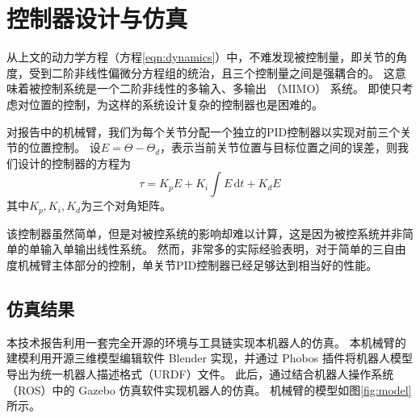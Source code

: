 \documentclass{ctexart}
\begin{document}
\section{控制器设计与仿真}

从上文的动力学方程（方程\ref{eqn:dynamics}）中，不难发现被控制量，即关节的角度，受到二阶非线性偏微分方程组的统治，且三个控制量之间是强耦合的。
这意味着被控制系统是一个二阶非线性的多输入、多输出 （MIMO） 系统。
即使只考虑对位置的控制，为这样的系统设计复杂的控制器也是困难的。

对报告中的机械臂，我们为每个关节分配一个独立的PID控制器以实现对前三个关节的位置控制。
设$E = \Theta - \Theta_d$，表示当前关节位置与目标位置之间的误差，则我们设计的控制器的方程为
\[
    \tau = K_p E + K_i \int E \, \mathrm d t + K_d \dot E
\]
其中$K_p, K_i, K_d$为三个对角矩阵。

该控制器虽然简单，但是对被控系统的影响却难以计算，这是因为被控系统并非简单的单输入单输出线性系统。
然而，非常多的实际经验表明，对于简单的三自由度机械臂主体部分的控制，单关节PID控制器已经足够达到相当好的性能。

\subsection{仿真结果}

本技术报告利用一套完全开源的环境与工具链实现本机器人的仿真。
本机械臂的建模利用开源三维模型编辑软件 Blender 实现，并通过 Phobos 插件将机器人模型导出为统一机器人描述格式（URDF）文件。
此后，通过结合机器人操作系统（ROS）中的 Gazebo 仿真软件实现机器人的仿真。
机械臂的模型如图\ref{fig:model}所示。
\end{document}

